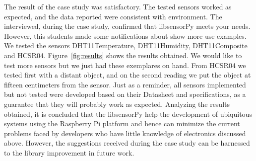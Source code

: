 \documentclass{acm_proc_article-sp}
\begin{document}
The result of the case study was satisfactory. The tested sensors worked as expected, and the data reported were consistent with environment. The interviewed, during the case study, confirmed that libsensorPy meets your needs. However, this students made some notifications about show more use examples.
\newline
\newline
We tested the sensors DHT11Temperature, DHT11Humidity, DHT11Composite and HCSR04. Figure~\ref{fig:results} shows the results obtained. We would like to test more sensors but we just had these exemplares on hand. From HCSR04 we tested first with a distant object, and on the second reading we put the object at fifteen centimeters from the sensor. Just as a reminder, all sensors implemented but not tested were developed based on their Datasheet and specifications, as a guarantee that they will probably work as expected.
\newline
\newline
Analyzing the results obtained, it is concluded that the libsensorPy help the development of ubiquitous systems using the Raspberry Pi platform and hence can minimize the current problems faced by developers who have little knowledge of electronics discussed above. However, the suggestions received during the case study can be harnessed to the library improvement in future work.
\end{document}
